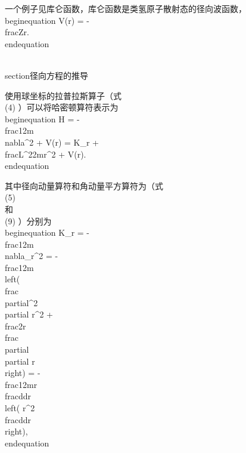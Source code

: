 一个例子见库仑函数，库仑函数是类氢原子散射态的径向波函数，
\\begin{equation}
    V(r) = -\\frac{Z}{r}.
\\end{equation}

\\section{径向方程的推导}

使用球坐标的拉普拉斯算子（式 \\ (4) ）可以将哈密顿算符表示为
\\begin{equation}
    H = -\\frac{1}{2m} \\nabla^2 + V(r) = K_r + \\frac{L^2}{2mr^2} + V(r).
\\end{equation}

其中径向动量算符和角动量平方算符为（式 \\ (5) \\ 和 \\ (9) ）分别为
\\begin{equation}
    K_r = -\\frac{1}{2m} \\nabla_r^2 = -\\frac{1}{2m} \\left( \\frac{\\partial^2}{\\partial r^2} + \\frac{2}{r} \\frac{\\partial}{\\partial r} \\right) = -\\frac{1}{2mr} \\frac{d}{dr} \\left( r^2 \\frac{d}{dr} \\right),
\\end{equation}


